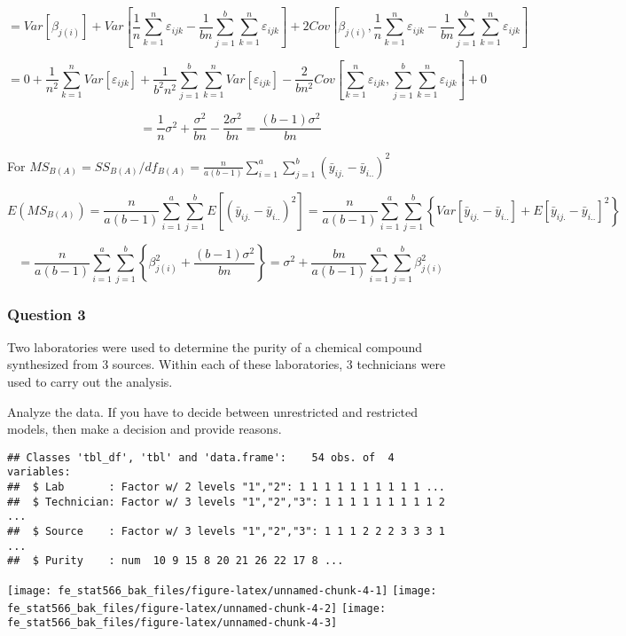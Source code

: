 \documentclass[12pt,]{article}
\begin{document}
\[=Var[\beta_{j(i)}]+Var[\frac1{n}\sum_{k=1}^n\varepsilon_{ijk}-\frac1{bn}\sum_{j=1}^b\sum_{k=1}^n\varepsilon_{ijk}]+2Cov[\beta_{j(i)},\frac1{n}\sum_{k=1}^n\varepsilon_{ijk}-\frac1{bn}\sum_{j=1}^b\sum_{k=1}^n\varepsilon_{ijk}]\]

\[=0+\frac1{n^2}\sum_{k=1}^nVar[\varepsilon_{ijk}]+\frac{1}{b^2n^2}\sum_{j=1}^b\sum_{k=1}^nVar[\varepsilon_{ijk}]-\frac{2}{bn^2}Cov[\sum_{k=1}^n\varepsilon_{ijk},\sum_{j=1}^b\sum_{k=1}^n\varepsilon_{ijk}]+0\]

\[=\frac1n\sigma^2+\frac{\sigma^2}{bn}-\frac{2\sigma^2}{bn}=\frac{(b-1)\sigma^2}{bn}\]

For
\(MS_{B(A)}=SS_{B(A)}/df_{B(A)}=\frac{n}{a(b-1)}\sum_{i=1}^a\sum_{j=1}^b(\bar y_{ij.}-\bar y_{i..})^2\)

\[E(MS_{B(A)})=\frac{n}{a(b-1)}\sum_{i=1}^a\sum_{j=1}^bE[(\bar y_{ij.}-\bar y_{i..})^2]=\frac{n}{a(b-1)}\sum_{i=1}^a\sum_{j=1}^b\left\{Var[\bar y_{ij.}-\bar y_{i..}]+E[\bar y_{ij.}-\bar y_{i..}]^2\right\}\]

\[=\frac{n}{a(b-1)}\sum_{i=1}^a\sum_{j=1}^b\left\{\beta_{j(i)}^2+\frac{(b-1)\sigma^2}{bn}\right\}=\sigma^2+\frac{bn}{a(b-1)}\sum_{i=1}^a\sum_{j=1}^b\beta_{j(i)}^2\]

\hypertarget{question-3}{%
\subsubsection{Question 3}\label{question-3}}

\textcolor[rgb]{0.7,0.7,0.7}{Two laboratories were used to determine the purity of a chemical compound synthesized from 3 sources. Within each of these laboratories, 3 technicians were used to carry out the analysis.
}

\textcolor[rgb]{0.7,0.7,0.7}{Analyze the data. If you have to decide between unrestricted and restricted models, then make a decision and provide reasons.}

\begin{verbatim}
## Classes 'tbl_df', 'tbl' and 'data.frame':    54 obs. of  4 variables:
##  $ Lab       : Factor w/ 2 levels "1","2": 1 1 1 1 1 1 1 1 1 1 ...
##  $ Technician: Factor w/ 3 levels "1","2","3": 1 1 1 1 1 1 1 1 1 2 ...
##  $ Source    : Factor w/ 3 levels "1","2","3": 1 1 1 2 2 2 3 3 3 1 ...
##  $ Purity    : num  10 9 15 8 20 21 26 22 17 8 ...
\end{verbatim}

\texttt{[image: fe\_stat566\_bak\_files/figure-latex/unnamed-chunk-4-1]}
\texttt{[image: fe\_stat566\_bak\_files/figure-latex/unnamed-chunk-4-2]}
\texttt{[image: fe\_stat566\_bak\_files/figure-latex/unnamed-chunk-4-3]}
\end{document}
